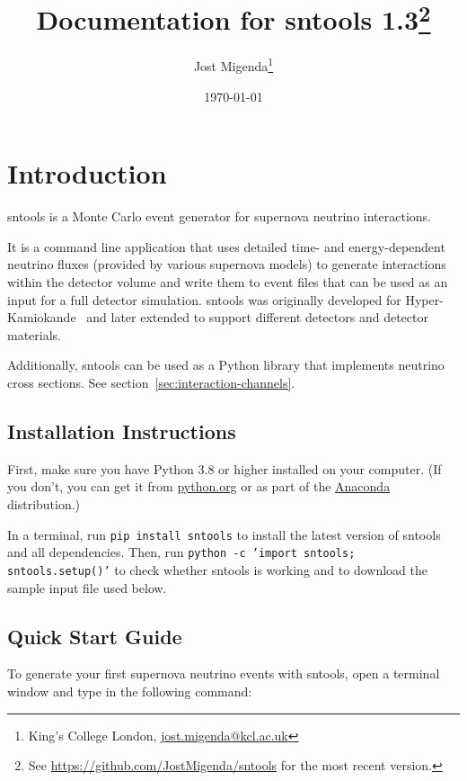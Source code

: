 \documentclass[11pt, oneside]{article}
\title{Documentation for sntools 1.3\footnote{See \url{https://github.com/JostMigenda/sntools} for the most recent version.}}
\author{Jost Migenda\footnote{King’s College London, \url{jost.migenda@kcl.ac.uk}}}
\date{\today}
\begin{document}
\maketitle
\setcounter{tocdepth}{2}
\tableofcontents
\clearpage


\section{Introduction}

sntools is a Monte Carlo event generator for supernova neutrino interactions.

It is a command line application that uses detailed time- and energy-dependent neutrino fluxes (provided by various supernova models) to generate interactions within the detector volume and write them to event files that can be used as an input for a full detector simulation.
sntools was originally developed for Hyper-Kamiokande~\cite{Migenda2019} and later extended to support different detectors and detector materials.

Additionally, sntools can be used as a Python library that implements neutrino cross sections. See section~\ref{sec:interaction-channels}.

\subsection{Installation Instructions}

First, make sure you have Python 3.8 or higher installed on your computer.
(If you don’t, you can get it from \href{https://www.python.org}{python.org} or as part of the \href{https://www.anaconda.com/products/individual}{Anaconda} distribution.)

In a terminal, run \texttt{pip install sntools} to install the latest version of sntools and all dependencies.
Then, run \texttt{python -c 'import sntools; sntools.setup()'} to check whether sntools is working and to download the sample input file used below.


\subsection{Quick Start Guide}

To generate your first supernova neutrino events with sntools, open a terminal window and type in the following command:
\end{document}

